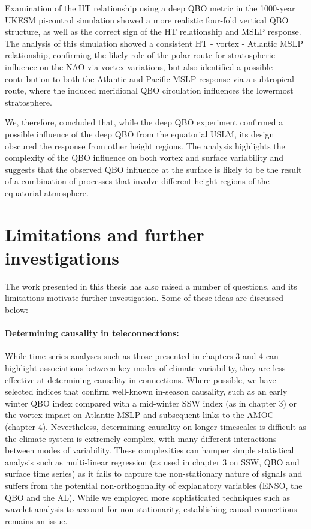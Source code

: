 Examination of the HT relationship using a deep QBO metric in the 1000-year UKESM pi-control simulation showed a more realistic four-fold vertical QBO structure, as well as the correct sign of the HT relationship and MSLP response. The analysis of this simulation showed a consistent HT - vortex - Atlantic MSLP relationship, confirming the likely role of the polar route for stratospheric influence on the NAO via vortex variations, but also identified a possible contribution to both the Atlantic and Pacific MSLP response via a subtropical route, where the induced meridional QBO circulation influences the lowermost stratosphere.  

We, therefore, concluded that, while the deep QBO experiment confirmed a possible influence of the deep QBO from the equatorial USLM, its design obscured the response from other height regions. The analysis highlights the complexity of the QBO influence on both vortex and surface variability and suggests that the observed QBO influence at the surface is likely to be the result of a combination of processes that involve different height regions of the equatorial atmosphere.  

\section{Limitations and further investigations}
\label{sec:limitations}
The work presented in this thesis has also raised a number of questions, and its limitations motivate further investigation. Some of these ideas are discussed below:

\paragraph{Determining causality in teleconnections:}
While time series analyses such as those presented in chapters 3 and 4 can highlight associations between key modes of climate variability, they are less effective at determining causality in connections. Where possible, we have selected indices that confirm well-known in-season causality, such as an early winter QBO index compared with a mid-winter SSW index (as in chapter 3) or the vortex impact on Atlantic MSLP and subsequent links to the AMOC (chapter 4). Nevertheless, determining causality on longer timescales is difficult as the climate system is extremely complex, with many different interactions between modes of variability. These complexities can hamper simple statistical analysis such as multi-linear regression (as used in chapter 3 on SSW, QBO and surface time series) as it fails to capture the non-stationary nature of signals and suffers from the potential non-orthogonality of explanatory variables (ENSO, the QBO and the AL). While we employed more sophisticated techniques such as wavelet analysis to account for non-stationarity, establishing causal connections remains an issue.

